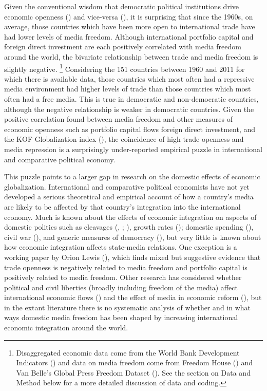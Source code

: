 \documentclass[12pt]{report}
\begin{document}
Given the conventional wisdom that democratic political institutions
drive economic openness (\citealt{Milner:2005ci}) and vice-versa
(\citealt{EICHENGREEN:2008gg}), it is surprising that since the 1960s,
on average, those countries which have been more open to international
trade have had lower levels of media freedom. Although international
portfolio capital and foreign direct investment are each positively
correlated with media freedom around the world, the bivariate relationship
between trade and media freedom is slightly negative.%
\footnote{Disaggregated economic data come from the World Bank Development Indicators (\citealt{WorldDevelopmentIn:2012wl}) and data on media freedom come
from Freedom House () and Van Belle's Global Press Freedom Dataset
(\citealt{van2000press}). See the section on Data and Method below
for a more detailed discussion of data and coding.%
} Considering the 151 countries between 1960 and 2011 for which there
is available data, those countries which most often had a repressive
media environment had higher levels of trade than those countries
which most often had a free media. This is true in democratic and
non-democratic countries, although the negative relationship is weaker
in democratic countries. Given the positive correlation found between
media freedom and other measures of economic openness such as portfolio
capital flows foreign direct investment, and the KOF Globalization
index (\citealt{dreher2008measuring}), the coincidence of high trade
openness and media repression is a surprisingly under-reported empirical
puzzle in international and comparative political economy.

This puzzle points to a larger gap in research on the domestic effects
of economic globalization. International and comparative political
economists have not yet developed a serious theoretical and empirical
account of how a country's media are likely to be affected by that
country's integration into the international economy. Much is known
about the effects of economic integration on aspects of domestic politics
such as cleavages (\citealt{Rogowski:1987ip}, \citeyear{Rogowski:1989wm};
\citealt{hiscox2002international}), growth rates (\citealt{Rodriguez:2001uw});
domestic spending (\citealt{Rodrik:1998te,Burgoon:2001dp}), civil
war (\citealt{Barbieri:2005uk,Bussmann:2007vx}), and generic measures
of democracy (\citealt{EICHENGREEN:2008gg,Li:2003vj}), but very little
is known about how economic integration affects state-media relations.
One exception is a working paper by Orion Lewis (\citeyear{Anonymous:lbhrCJXF}),
which finds mixed but suggestive evidence that trade openness is negatively
related to media freedom and portfolio capital is positively related
to media freedom. Other research has considered whether political
and civil liberties (broadly including freedom of the media) affect
international economic flows (\cite{Adam:2007gn}) and the effect
of media in economic reform (\citealt{Coyne:2004bq,Islam:2002uc}),
but in the extant literature there is no systematic analysis of whether
and in what ways domestic media freedom has been shaped by increasing
international economic integration around the world.
\end{document}
